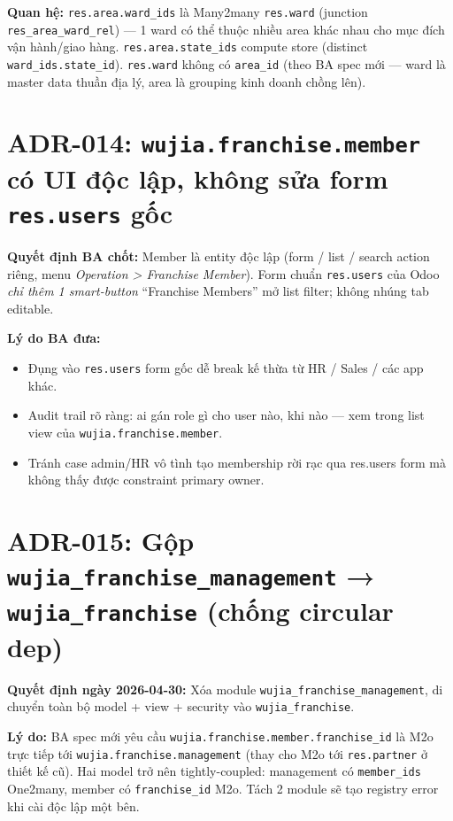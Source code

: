 \textbf{Quan hệ:} \texttt{res.area.ward\_ids} là Many2many \texttt{res.ward} (junction \texttt{res\_area\_ward\_rel}) --- 1 ward có thể thuộc nhiều area khác nhau cho mục đích vận hành/giao hàng. \texttt{res.area.state\_ids} compute store (distinct \texttt{ward\_ids.state\_id}). \texttt{res.ward} không có \texttt{area\_id} (theo BA spec mới --- ward là master data thuần địa lý, area là grouping kinh doanh chồng lên).

\section{ADR-014: \texttt{wujia.franchise.member} có UI độc lập, không sửa form \texttt{res.users} gốc}

\textbf{Quyết định BA chốt:} Member là entity độc lập (form / list / search action riêng, menu \emph{Operation > Franchise Member}). Form chuẩn \texttt{res.users} của Odoo \emph{chỉ thêm 1 smart-button} ``Franchise Members'' mở list filter; không nhúng tab editable.

\textbf{Lý do BA đưa:}
\begin{itemize}
    \item Đụng vào \texttt{res.users} form gốc dễ break kế thừa từ HR / Sales / các app khác.
    \item Audit trail rõ ràng: ai gán role gì cho user nào, khi nào --- xem trong list view của \texttt{wujia.franchise.member}.
    \item Tránh case admin/HR vô tình tạo membership rời rạc qua res.users form mà không thấy được constraint primary owner.
\end{itemize}

\section{ADR-015: Gộp \texttt{wujia\_franchise\_management} → \texttt{wujia\_franchise} (chống circular dep)}

\textbf{Quyết định ngày 2026-04-30:} Xóa module \texttt{wujia\_franchise\_management}, di chuyển toàn bộ model + view + security vào \texttt{wujia\_franchise}.

\textbf{Lý do:} BA spec mới yêu cầu \texttt{wujia.franchise.member.franchise\_id} là M2o trực tiếp tới \texttt{wujia.franchise.management} (thay cho M2o tới \texttt{res.partner} ở thiết kế cũ). Hai model trở nên tightly-coupled: management có \texttt{member\_ids} One2many, member có \texttt{franchise\_id} M2o. Tách 2 module sẽ tạo registry error khi cài độc lập một bên.

